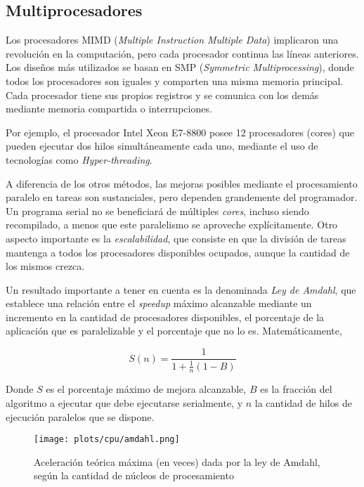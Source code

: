 \subsection{Multiprocesadores}

Los procesadores MIMD (\textit{Multiple Instruction Multiple Data}) implicaron una revoluci\'on en la computaci\'on, pero
cada procesador continua las l\'ineas anteriores.  Los dise\~nos m\'as utilizados se basan en SMP (\textit{Symmetric
Multiprocessing}), donde todos los procesadores son iguales y comparten una misma memoria principal. Cada procesador tiene
sus propios registros y se comunica con los dem\'as mediante memoria compartida o interrupciones.

Por ejemplo, el procesador Intel Xeon E7-8800 posee 12 procesadores (cores) que pueden ejecutar dos hilos simult\'aneamente
cada uno, mediante el uso de tecnolog\'ias como \textit{Hyper-threading}.

A diferencia de los otros m\'etodos, las mejoras posibles mediante el procesamiento paralelo en tareas son sustanciales,
pero dependen grandemente del programador. Un programa serial no se beneficiar\'a de m\'ultiples \textit{cores},
incluso siendo recompilado, a menos que este paralelismo se aproveche expl\'icitamente. Otro aspecto importante es la
\textit{escalabilidad}, que consiste en que la divisi\'on de tareas mantenga a todos los procesadores disponibles ocupados,
aunque la cantidad de los mismos crezca.

Un resultado importante a tener en cuenta es la denominada \textit{Ley de Amdahl}, que establece una relaci\'on entre
el \textit{speedup} m\'aximo alcanzable mediante un incremento en la cantidad de procesadores disponibles, el porcentaje
de la aplicaci\'on que es paralelizable y el porcentaje que no lo es. Matem\'aticamente,

\begin{equation}
    \label{eq:amdahl}
    S(n) = \frac{1}{1 + \frac{1}{n} (1 - B)}
\end{equation}

Donde $S$ es el porcentaje m\'aximo de mejora alcanzable, $B$ es la fracci\'on del algoritmo a ejecutar que debe ejecutarse
serialmente, y $n$ la cantidad de hilos de ejecuci\'on paralelos que se dispone.

\begin{figure}[htbp]
    \centering
    \texttt{[image: plots/cpu/amdahl.png]}
    \caption{Aceleraci\'on te\'orica m\'axima (en veces) dada por la ley de Amdahl, seg\'un la cantidad de n\'ucleos de procesamiento}
    \label{fig:amdahl_plot}
\end{figure}

